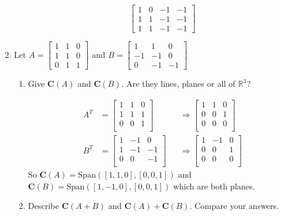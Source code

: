 \documentclass[letterpaper]{article}
\begin{document}
\begin{enumerate}
\begin{enumerate}
  \[\left[\begin{array}{rrrr}1&0&-1&-1\\1&1&-1&-1\\1&1&-1&-1\end{array}\right]\]
  \end{enumerate}
\item
  Let $A=\left[\begin{array}{rrr}1&1&0\\1&1&0\\0&1&1\end{array}\right]$ and $B=\left[\begin{array}{rrr}1&1&0\\-1&-1&0\\0&-1&-1\end{array}\right]$
  \begin{enumerate}
  \item
  Give $\mathbf{C}(A)$ and $\mathbf{C}(B)$. Are they lines, planes or all of $\mathbb{R}^3$?

  \begin{align*}
    A^T&=
    \left[\begin{array}{rrr}
      1&1&0\\
      1&1&1\\
      0&0&1\\
    \end{array}\right]
    &&\Rightarrow
    \left[\begin{array}{rrr}
      1&1&0\\
      0&0&1\\
      0&0&0\\
    \end{array}\right]\\
    B^T&=
    \left[\begin{array}{rrr}
      1&-1& 0\\
      1&-1&-1\\
      0& 0&-1\\
    \end{array}\right]
    &&\Rightarrow
    \left[\begin{array}{rrr}
      1&-1& 0\\
      0& 0& 1\\
      0& 0& 0\\
    \end{array}\right]
  \end{align*}
  So $\mathbf{C}(A)=\text{Span}([1,1,0],[0,0,1])$ and $\mathbf{C}(B)=\text{Span}([1,-1,0],[0,0,1])$ which are both planes.
  \item
  Describe $\mathbf{C}(A+B)$ and $\mathbf{C}(A)+\mathbf{C}(B)$. Compare your answers. 


\end{enumerate}
\end{enumerate}
\end{document}
